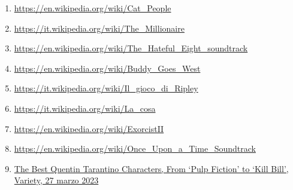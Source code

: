 \documentclass[12pt]{article} %
\begin{document}
\begin{flushleft}
\begin{enumerate}
        \item \href{https://en.wikipedia.org/wiki/Cat_People_(1942_film)}{https://en.wikipedia.org/wiki/Cat\_People}
        \item \href{https://it.wikipedia.org/wiki/The_Millionaire_(film_2008)}{https://it.wikipedia.org/wiki/The\_Millionaire}
        \item \href{https://en.wikipedia.org/wiki/The_Hateful_Eight_(soundtrack)}{https://en.wikipedia.org/wiki/The\_Hateful\_Eight\_soundtrack}
        \item \href{https://en.wikipedia.org/wiki/Buddy_Goes_West}{https://en.wikipedia.org/wiki/Buddy\_Goes\_West}
        \item \href{https://it.wikipedia.org/wiki/Il_gioco_di_Ripley}{https://it.wikipedia.org/wiki/Il\_gioco\_di\_Ripley}
        \item \href{https://it.wikipedia.org/wiki/La_cosa_(film_1982)}{https://it.wikipedia.org/wiki/La\_cosa}
        \item \href{https://en.wikipedia.org/wiki/Exorcist_II:_The_Heretic}{https://en.wikipedia.org/wiki/ExorcistII}
        \item \href{https://en.wikipedia.org/wiki/Once_Upon_a_Time_in_Hollywood_(soundtrack)}{https://en.wikipedia.org/wiki/Once\_Upon\_a\_Time\_Soundtrack}
        \item \href{https://variety.com/lists/best-quentin-tarantino-characters/}{The Best Quentin Tarantino Characters, From ‘Pulp Fiction’ to ‘Kill Bill’, Variety, 27 marzo 2023}
        \end{enumerate}
\end{flushleft}
\break
\end{document}
